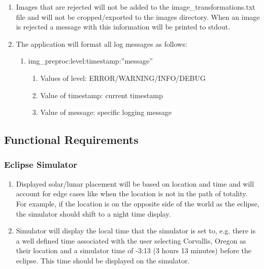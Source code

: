 \documentclass[10pt, onecolumn, draftclsnofoot, letterpaper, compsoc]{IEEEtran}
\begin{document}
\begin{enumerate}
		 \item Images that are rejected will not be added to the 
		 image\_transformations.txt file and will not be cropped/exported to
		  the images directory. When an image is rejected a message with this 
		 information will be printed to stdout.

		 \item The application will format all log messages as follows:
		 \begin{enumerate}
		 	\item img\_preproc:level:timestamp:”message”
		 	\begin{enumerate}
		 		\item Values of level: ERROR/WARNING/INFO/DEBUG
		 		\item Value of timestamp: current timestamp
		 		\item Value of message: specific logging message
		 	\end{enumerate}
		 \end{enumerate}
	\end{enumerate}

\subsection{Functional Requirements}

\subsubsection{Eclipse Simulator}
	\begin{enumerate}
		\item Displayed solar/lunar placement will be based on location and 
		time and will account for edge cases like when the location is not in 
		the path of totality. For example, if the location is on the opposite 
		side of the world as the eclipse, the simulator should shift to a night
		time display.

		\item Simulator will display the local time that the simulator is set 
		to, e.g. there is a well defined time associated with the user 
		selecting Corvallis, Oregon as their location and a simulator time of 
		-3:13 (3 hours 13 minutes) before the eclipse. This time should be 
		displayed on the simulator.
	\end{enumerate}
\end{document}
